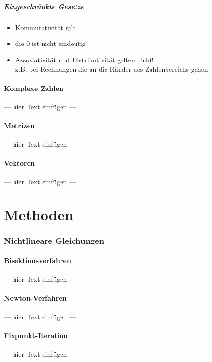 \documentclass[a4paper, 12pt]{article}
\begin{document}
\subsubsection*{Eingeschränkte Gesetze}
\begin{itemize}
  \item Kommutativität gilt
  \item die 0 ist nicht eindeutig
  \item Assoziativität und Distributivität gelten nicht!\\
    z.B. bei Rechnungen die an die Ränder des Zahlenbereichs gehen
\end{itemize}


\subsection{Komplexe Zahlen}
--- hier Text einfügen ---


\subsection{Matrizen}
--- hier Text einfügen ---


\subsection{Vektoren}
--- hier Text einfügen ---




\part{Methoden}



\section{Nichtlineare Gleichungen}


\subsection{Bisektionsverfahren}
--- hier Text einfügen ---


\subsection{Newton-Verfahren}
--- hier Text einfügen ---


\subsection{Fixpunkt-Iteration}
--- hier Text einfügen ---
\end{document}
